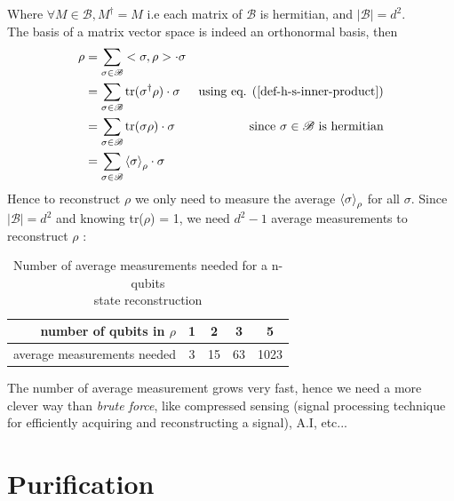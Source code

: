 \documentclass{article}
\begin{document}
Where $\forall M \in \mathscr{B}, M^\dagger = M$ i.e each matrix of
$\mathscr{B}$ is hermitian, and $|\mathscr{B}|=d^2$. \\
The basis of a matrix vector space is indeed an orthonormal basis, then
\begin{equation}
    \begin{aligned}
        \rho
            & = \sum_{\sigma \in \mathscr{B}} <\sigma, \rho> \cdot \sigma & \\
            & = \sum_{\sigma \in \mathscr{B}} \text{tr}(\sigma^\dagger \rho) \cdot \sigma
                & \text{using eq. (\ref{def-h-s-inner-product})} \\
            & = \sum_{\sigma \in \mathscr{B}} \text{tr}(\sigma \rho) \cdot \sigma
                & \text{since $\sigma \in \mathscr{B}$ is hermitian} \\
            & = \sum_{\sigma \in \mathscr{B}}\braket{\sigma}_\rho\cdot \sigma &
    \end{aligned}
\end{equation}
Hence to reconstruct $\rho$ we only need to measure the average
$\braket{\sigma}_\rho$ for all $\sigma$. Since $|\mathscr{B}|=d^2$ and knowing
tr($\rho$) = 1, we need $d^2 - 1$ average measurements to reconstruct $\rho$ :

\begin{table}[h]
\centering
\begin{tabular}{r|cccc}
    number of qubits in $\rho$ & 1 & 2 & 3 & 5 \\ \hline
    average measurements needed & 3 & 15 & 63 & 1023
\end{tabular}
\caption{Number of average measurements needed for a n-qubits\\state reconstruction}
\end{table}
\noindent
The number of average measurement grows very fast, hence we need a more clever
way than \textit{brute force}, like compressed sensing (signal processing
technique for efficiently acquiring and reconstructing a signal), A.I, etc...

\section{Purification}
\end{document}

